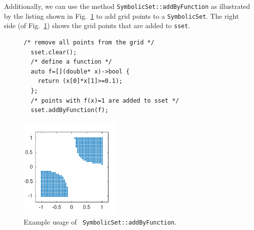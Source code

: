 \documentclass[a4paper]{amsart}
\begin{document}
Additionally, we can use the method {\tt\small SymbolicSet::addByFunction} as
illustrated by the listing shown in Fig.~\ref{f:addbyfunction} to add grid
points to a {\tt\small SymbolicSet}. The right
side (of Fig.~\ref{f:addbyfunction}) shows the grid points that are added to
{\tt\small sset}.
\begin{figure}[h]
\begin{minipage}{0.6\textwidth}
\begin{lstlisting}[basicstyle=\footnotesize\ttfamily]
  /* remove all points from the grid */
  sset.clear();
  /* define a function */
  auto f=[](double* x)->bool {
    return (x[0]*x[1]>=0.1);
  };
  /* points with f(x)=1 are added to sset */
  sset.addByFunction(f);          
\end{lstlisting}
\end{minipage}%
\begin{minipage}{0.4\textwidth}
  \centering
  \includegraphics[width=5cm]{figures/rectangle4}
\end{minipage}
\caption{Example usage of {\tt\small
SymbolicSet::addByFunction}.}\label{f:addbyfunction}
\end{figure}
\end{document}
